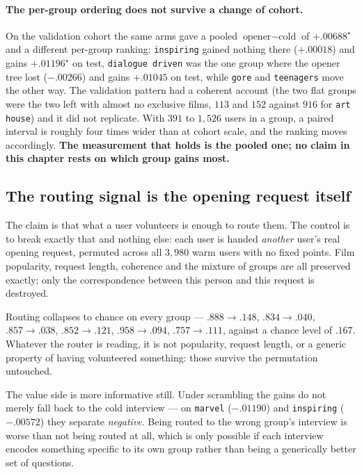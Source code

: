 \documentclass[11pt]{article}
\begin{document}
\paragraph{The per-group ordering does not survive a change of cohort.}
On the validation cohort the same arms gave a pooled $\text{opener}-\text{cold}$ of $+.00688^\star$ and a
different per-group ranking: \texttt{inspiring} gained nothing there ($+.00018$) and gains
$+.01196^\star$ on test, \texttt{dialogue driven} was the one group where the opener tree lost
($-.00266$) and gains $+.01045$ on test, while \texttt{gore} and \texttt{teenagers} move the other way.
The validation pattern had a coherent account (the two flat groups were the two left with almost no
exclusive films, $113$ and $152$ against $916$ for \texttt{art house}) and it did not replicate. With
$391$ to $1{,}526$ users in a group, a paired interval is roughly four times wider than at cohort scale,
and the ranking moves accordingly. \textbf{The measurement that holds is the pooled one; no claim in
this chapter rests on which group gains most.}

\subsection{The routing signal is the opening request itself}
\label{sec:scramble}

The claim is that what a user volunteers is enough to route them. The control is to break exactly
that and nothing else: each user is handed \emph{another} user's real opening request, permuted across
all $3{,}980$ warm users with no fixed points. Film popularity, request length, coherence and the
mixture of groups are all preserved exactly; only the correspondence between this person and this
request is destroyed.

Routing collapses to chance on every group --- $.888\!\rightarrow\!.148$, $.834\!\rightarrow\!.040$,
$.857\!\rightarrow\!.038$, $.852\!\rightarrow\!.121$, $.958\!\rightarrow\!.094$,
$.757\!\rightarrow\!.111$, against a chance level of $.167$. Whatever the router is reading, it is not
popularity, request length, or a generic property of having volunteered something: those survive the
permutation untouched.

The value side is more informative still. Under scrambling the gains do not merely fall back to the
cold interview --- on \texttt{marvel} ($-.01190$) and \texttt{inspiring} ($-.00572$) they separate
\emph{negative}. Being routed to the wrong group's interview is worse than not being routed at all,
which is only possible if each interview encodes something specific to its own group rather than
being a generically better set of questions.
\end{document}
